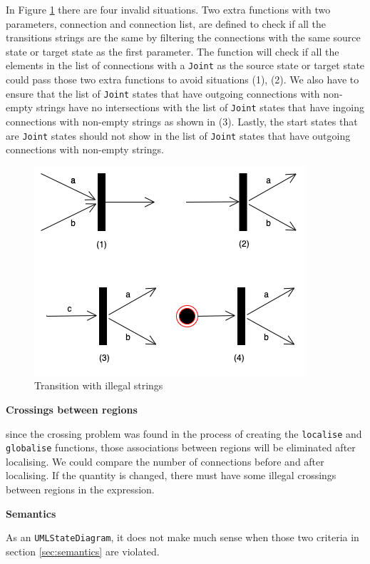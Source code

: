 In Figure \ref{fig:Transition with illegal strings} there are four invalid situations.
Two extra functions with two parameters, connection and connection list, are defined to check if all the transitions strings are the same by filtering the connections with the same source state or target state as the first parameter.  
The function will check if all the elements in the list of connections with a \verb|Joint| as the source state or target state could pass those two extra functions to avoid situations (1), (2).
We also have to ensure that the list of \verb|Joint| states that have outgoing connections with non-empty strings have no intersections with the list of  \verb|Joint| states that have ingoing connections with non-empty strings as shown in (3).
Lastly, the start states that are \verb|Joint| states should not show in the list of  \verb|Joint| states that have outgoing connections with non-empty strings.
\begin{figure}[ht]
    \centering
    \includegraphics[scale=0.5]{Bilder/transitions.png}
    \caption{Transition with illegal strings}
    \label{fig:Transition with illegal strings}
\end{figure}

\textbf{Crossings between regions}

since the crossing problem was found in the process of creating the \verb|localise| and \verb|globalise| functions, those associations between regions will be eliminated after localising. 
We could compare the number of connections before and after localising. If the quantity is changed, there must have some illegal crossings between regions in the expression.

\textbf{Semantics} 

As an \verb|UMLStateDiagram|, it does not make much sense when those two criteria in section \ref{sec:semantics} are violated.

